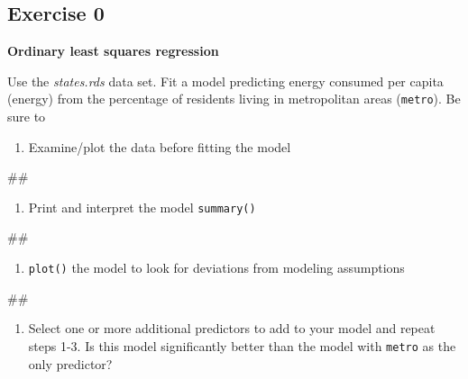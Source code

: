\documentclass[]{book}
\newenvironment{Shaded}{\begin{snugshade}}{\end{snugshade}}
\newcommand{\NormalTok}[1]{#1}
\providecommand{\tightlist}{%
  \setlength{\itemsep}{0pt}\setlength{\parskip}{0pt}}
\begin{document}
\subsection{Exercise 0}\label{exercise-0-1}

\textbf{Ordinary least squares regression}

Use the \emph{states.rds} data set. Fit a model predicting energy
consumed per capita (energy) from the percentage of residents living in
metropolitan areas (\texttt{metro}). Be sure to

\begin{enumerate}
\def\labelenumi{\arabic{enumi}.}
\tightlist
\item
  Examine/plot the data before fitting the model
\end{enumerate}

\begin{Shaded}
\begin{Highlighting}[]
\NormalTok{## }
\end{Highlighting}
\end{Shaded}

\begin{enumerate}
\def\labelenumi{\arabic{enumi}.}
\setcounter{enumi}{1}
\tightlist
\item
  Print and interpret the model \texttt{summary()}
\end{enumerate}

\begin{Shaded}
\begin{Highlighting}[]
\NormalTok{## }
\end{Highlighting}
\end{Shaded}

\begin{enumerate}
\def\labelenumi{\arabic{enumi}.}
\setcounter{enumi}{2}
\tightlist
\item
  \texttt{plot()} the model to look for deviations from modeling
  assumptions
\end{enumerate}

\begin{Shaded}
\begin{Highlighting}[]
\NormalTok{## }
\end{Highlighting}
\end{Shaded}

\begin{enumerate}
\def\labelenumi{\arabic{enumi}.}
\setcounter{enumi}{3}
\tightlist
\item
  Select one or more additional predictors to add to your model and
  repeat steps 1-3. Is this model significantly better than the model
  with \texttt{metro} as the only predictor?
\end{enumerate}
\end{document}
